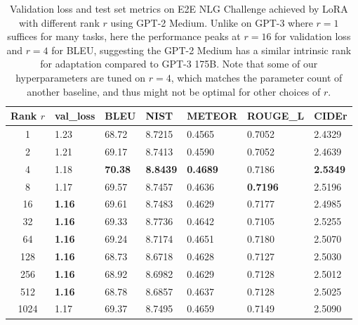 \documentclass{article} %
\begin{document}
\begin{table}[h]
  \centering
  \begin{tabular}{c|llllll}
  \toprule
Rank $r$& val\_loss     & BLEU            & NIST            & METEOR          & ROUGE\_L        & CIDEr           \\
\midrule
1    & 1.23          & 68.72          & 8.7215          & 0.4565          & 0.7052          & 2.4329          \\
2    & 1.21          & 69.17          & 8.7413          & 0.4590          & 0.7052          & 2.4639          \\
4    & 1.18          & \textbf{70.38} & \textbf{8.8439} & \textbf{0.4689} & 0.7186          & \textbf{2.5349} \\
8    & 1.17          & 69.57          & 8.7457          & 0.4636          & \textbf{0.7196} & 2.5196          \\
16   & \textbf{1.16} & 69.61          & 8.7483          & 0.4629          & 0.7177          & 2.4985          \\
32   & \textbf{1.16} & 69.33          & 8.7736          & 0.4642          & 0.7105          & 2.5255          \\
64   & \textbf{1.16} & 69.24          & 8.7174          & 0.4651          & 0.7180          & 2.5070          \\
128  & \textbf{1.16} & 68.73          & 8.6718          & 0.4628          & 0.7127          & 2.5030          \\
256  & \textbf{1.16} & 68.92          & 8.6982          & 0.4629          & 0.7128          & 2.5012          \\
512  & \textbf{1.16} & 68.78          & 8.6857          & 0.4637          & 0.7128          & 2.5025          \\
1024 & 1.17          & 69.37          & 8.7495          & 0.4659          & 0.7149          & 2.5090          \\
  \bottomrule
  \end{tabular}
  \caption{Validation loss and test set metrics on E2E NLG Challenge achieved by LoRA with different rank $r$ using GPT-2 Medium. Unlike on GPT-3 where $r=1$ suffices for many tasks, here the performance peaks at $r=16$ for validation loss and $r=4$ for BLEU, suggesting the GPT-2 Medium has a similar intrinsic rank for adaptation compared to GPT-3 175B. Note that some of our hyperparameters are tuned on $r=4$, which matches the parameter count of another baseline, and thus might not be optimal for other choices of $r$.}
  \label{tab:effect_of_r_gpt2}
\end{table}
\end{document}
